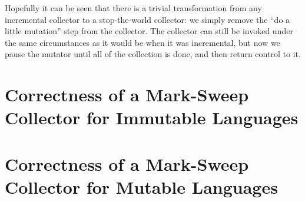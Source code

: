 Hopefully it can be seen that there is a trivial transformation from
any \gls{incremental collector} to a stop-the-world \gls{collector}:
we simply remove the ``do a little mutation'' step from the
collector. The collector can still be invoked under the same
circumstances as it would be when it was incremental, but now we pause
the \gls{mutator} until all of the collection is done, and then return
control to it.

\section{Correctness of a Mark-Sweep Collector for Immutable
  Languages}


\section{Correctness of a Mark-Sweep Collector for Mutable Languages}

